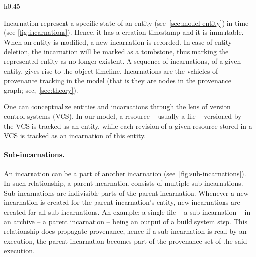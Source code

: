 \begin{wrapfigure}{h}{0.45\textwidth}
\caption{Incarnations of \texttt{file.txt}.}
\label{fig:incarnations}
\end{wrapfigure}

Incarnation represent a specific state of an entity (see~\cref{sec:model-entity}) in time (see \cref{fig:incarnations}). Hence, it has a creation timestamp and it is immutable. When an entity is modified, a new incarnation is recorded. In case of entity deletion, the incarnation will be marked as a tombstone, thus marking the represented entity as no-longer existent. A sequence of incarnations, of a given entity, gives rise to the object timeline. Incarnations are the vehicles of provenance tracking in the model (that is they are nodes in the provenance graph; see,~\cref{sec:theory}).

One can conceptualize entities and incarnations through the lens of version control systems (VCS). In our model, a resource -- usually a file -- versioned by the VCS is tracked as an entity, while each revision of a given resource stored in a VCS is tracked as an incarnation of this entity.

\paragraph{Sub-incarnations.}\label{sec:model-subincarnation}

An incarnation can be a part of another incarnation (see~\cref{fig:sub-incarnations}). In such relationship, a parent incarnation consists of multiple sub-incarnations. Sub-incarnations are indivisible parts of the parent incarnation. Whenever a new incarnation is created for the parent incarnation’s entity, new incarnations are created for all sub-incarnations. An example: a single file -- a sub-incarnation -- in an archive -- a parent incarnation -- being an output of a build system step. 
This relationship does propagate provenance, hence if a sub-incarnation is read by an execution, the parent incarnation becomes part of the provenance set of the said execution.

